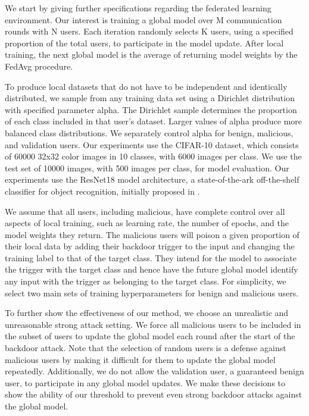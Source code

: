 \documentclass{article} %
\begin{document}
We start by giving further specifications regarding the federated learning environment. Our interest is training a global model over M communication rounds with N users. Each iteration randomly selects K users, using a specified proportion of the total users, to participate in the model update. After local training, the next global model is the average of returning model weights by the FedAvg procedure. 

To produce local datasets that do not have to be independent and identically distributed, we sample from any training data set using a Dirichlet distribution with specified parameter alpha. The Dirichlet sample determines the proportion of each class included in that user's dataset. Larger values of alpha produce more balanced class distributions. We separately control alpha for benign, malicious, and validation users. Our experiments use the CIFAR-10 dataset, which consists of 60000 32x32 color images in 10 classes, with 6000 images per class. We use the test set of 10000 images, with 500 images per class, for model evaluation. Our experiments use the ResNet18 model architecture, a state-of-the-ark off-the-shelf classifier for object recognition, initially proposed in \cite{resnet}. 

We assume that all users, including malicious, have complete control over all aspects of local training, such as learning rate, the number of epochs, and the model weights they return. The malicious users will poison a given proportion of their local data by adding their backdoor trigger to the input and changing the training label to that of the target class. They intend for the model to associate the trigger with the target class and hence have the future global model identify any input with the trigger as belonging to the target class. For simplicity, we select two main sets of training hyperparameters for benign and malicious users. 

To further show the effectiveness of our method, we choose an unrealistic and unreasonable strong attack setting. We force all malicious users to be included in the subset of users to update the global model each round after the start of the backdoor attack. Note that the selection of random users is a defense against malicious users by making it difficult for them to update the global model repeatedly. Additionally, we do not allow the validation user, a guaranteed benign user, to participate in any global model updates. We make these decisions to show the ability of our threshold to prevent even strong backdoor attacks against the global model. 
\end{document}
